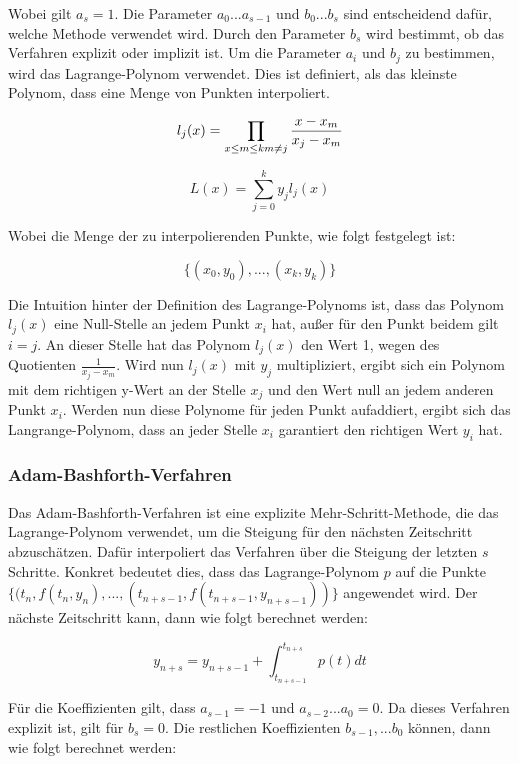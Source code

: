 Wobei gilt $a_s = 1$.  Die Parameter $a_0 ... a_{s-1}$ und $b_0 ... b_{s}$ sind entscheidend dafür, welche Methode verwendet wird.
Durch den Parameter $b_s$ wird bestimmt, ob das Verfahren explizit oder
implizit ist.
Um die Parameter $a_i$ und $b_j$ zu bestimmen, wird das Lagrange-Polynom \cite[Kapitel~3.1.2]{numerisch_langrange} verwendet.
Dies ist definiert, als das kleinste Polynom, dass eine Menge von Punkten interpoliert.

$$
l_j(x) = \prod_{x \leq m \leq k \\ m \neq j} \frac{x - x_m}{x_j - x_m}
$$

$$
L(x) = \sum_{j = 0}^{k} y_j l_j(x)
$$

Wobei die Menge der zu interpolierenden Punkte, wie folgt festgelegt ist:

$$
\{(x_0, y_0), ..., (x_k, y_k)\}
$$

Die Intuition hinter der Definition des Lagrange-Polynoms ist, 
dass das Polynom $l_j(x)$ eine Null-Stelle an jedem Punkt $x_i$ hat, außer für den Punkt beidem gilt $i = j$. 
An dieser Stelle hat das Polynom $l_j(x)$ den Wert 1, wegen des Quotienten $\frac{1}{x_j - x_m}$.
Wird nun $l_j(x)$ mit $y_j$ multipliziert, ergibt sich ein Polynom mit dem richtigen y-Wert an der Stelle $x_j$ und den Wert null an jedem anderen Punkt $x_i$.
Werden nun diese Polynome für jeden Punkt aufaddiert,
ergibt sich das Langrange-Polynom, dass an jeder Stelle $x_i$ garantiert den richtigen Wert $y_i$ hat.


\subsubsection{Adam-Bashforth-Verfahren} \label{sec:adam-bashforth}

Das Adam-Bashforth-Verfahren ist eine explizite Mehr-Schritt-Methode, 
die das Lagrange-Polynom verwendet, 
um die Steigung für den nächsten Zeitschritt abzuschätzen. 
Dafür interpoliert das Verfahren über die Steigung der letzten $s$ Schritte.
Konkret bedeutet dies, dass das Lagrange-Polynom $p$ auf die Punkte $\{(t_{n}, f(t_{n}, y_{n}), ..., (t_{n + s - 1}, f(t_{n + s - 1}, y_{n + s - 1}))\}$ angewendet wird.
Der nächste Zeitschritt kann, dann wie folgt berechnet werden:

$$
y_{n + s} = y_{n + s -1} + \int_{t_{n+s-1}}^{t_{n + s}} p(t) dt
$$

Für die Koeffizienten gilt, dass $a_{s-1} = -1$ und $a_{s-2} ... a_{0} = 0$. 
Da dieses Verfahren explizit ist, gilt für $b_s = 0$. Die restlichen Koeffizienten $b_{s-1}, ... b_{0}$
können, dann wie folgt berechnet werden:


